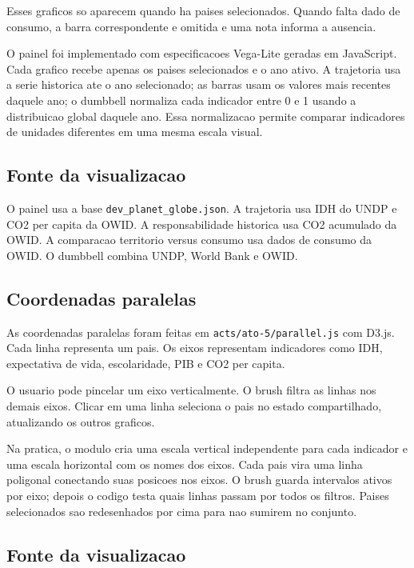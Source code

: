 \documentclass[12pt,a4paper]{article}
\begin{document}
Esses graficos so aparecem quando ha paises selecionados. Quando falta dado de consumo, a barra correspondente e omitida e uma nota informa a ausencia.

O painel foi implementado com especificacoes Vega-Lite geradas em JavaScript. Cada grafico recebe apenas os paises selecionados e o ano ativo. A trajetoria usa a serie historica ate o ano selecionado; as barras usam os valores mais recentes daquele ano; o dumbbell normaliza cada indicador entre 0 e 1 usando a distribuicao global daquele ano. Essa normalizacao permite comparar indicadores de unidades diferentes em uma mesma escala visual.

\subsection{Fonte da visualizacao}

O painel usa a base \texttt{dev\_planet\_globe.json}. A trajetoria usa IDH do UNDP e CO2 per capita da OWID. A responsabilidade historica usa CO2 acumulado da OWID. A comparacao territorio versus consumo usa dados de consumo da OWID. O dumbbell combina UNDP, World Bank e OWID.

\subsection{Coordenadas paralelas}

As coordenadas paralelas foram feitas em \texttt{acts/ato-5/parallel.js} com D3.js. Cada linha representa um pais. Os eixos representam indicadores como IDH, expectativa de vida, escolaridade, PIB e CO2 per capita.

O usuario pode pincelar um eixo verticalmente. O brush filtra as linhas nos demais eixos. Clicar em uma linha seleciona o pais no estado compartilhado, atualizando os outros graficos.

Na pratica, o modulo cria uma escala vertical independente para cada indicador e uma escala horizontal com os nomes dos eixos. Cada pais vira uma linha poligonal conectando suas posicoes nos eixos. O brush guarda intervalos ativos por eixo; depois o codigo testa quais linhas passam por todos os filtros. Paises selecionados sao redesenhados por cima para nao sumirem no conjunto.

\subsection{Fonte da visualizacao}
\end{document}
